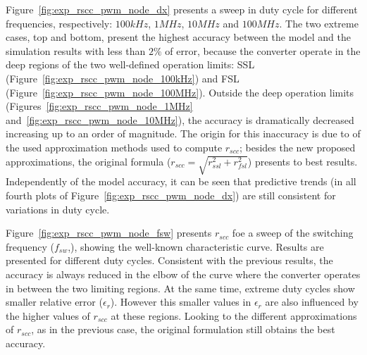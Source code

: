 Figure~\ref{fig:exp_rscc_pwm_node_dx} presents a sweep in duty cycle for different frequencies, respectively: $100kHz$, $1MHz$, $10MHz$ and $100MHz$. The two extreme cases, top and bottom, present the highest accuracy between the model and the simulation results with less than $2\%$ of error, because the converter operate in the deep regions of the two well-defined operation limits: SSL (Figure~\ref{fig:exp_rscc_pwm_node_100kHz}) and FSL (Figure~\ref{fig:exp_rscc_pwm_node_100MHz}). Outside the deep operation limits (Figures~\ref{fig:exp_rscc_pwm_node_1MHz} and~\ref{fig:exp_rscc_pwm_node_10MHz}), the accuracy is dramatically decreased increasing up to an order of magnitude. The origin for this inaccuracy is due to of the used approximation methods used to compute $r_{scc}$; besides the new proposed approximations, the original formula ($r_{scc} = \sqrt{r_{ssl}^2 + r_{fsl}^2}$) presents to best results. Independently of the model accuracy, it can be seen that predictive trends (in all fourth plots of Figure~\ref{fig:exp_rscc_pwm_node_dx}) are still consistent for variations in duty cycle.

Figure~\ref{fig:exp_rscc_pwm_node_fsw} presents $r_{scc}$ foe a sweep of the switching frequency ($f_{sw}$,), showing the well-known characteristic curve. Results are presented  for different duty cycles. Consistent with the previous results, the accuracy is always reduced in the elbow of the curve where the converter operates in between the two limiting regions. At the same time, extreme duty cycles show smaller relative error ($\epsilon_r$). However this smaller values in $\epsilon_r$ are also influenced by the higher values of $r_{scc}$ at these regions.  Looking to the different approximations of $r_{scc}$, as in the previous case, the original formulation still obtains the best accuracy.

